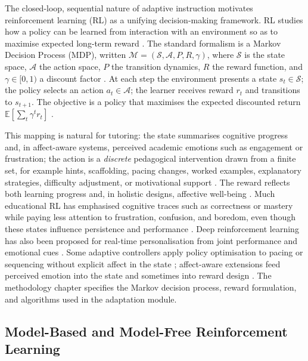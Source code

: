 The closed-loop, sequential nature of adaptive instruction motivates reinforcement learning (RL) as a unifying decision-making framework. RL studies how a policy can be learned from interaction with an environment so as to maximise expected long-term reward \cite{sutton_rl_book_2018}. The standard formalism is a Markov Decision Process (MDP), written $\mathcal{M} = (\mathcal{S}, \mathcal{A}, P, R, \gamma)$, where $\mathcal{S}$ is the state space, $\mathcal{A}$ the action space, $P$ the transition dynamics, $R$ the reward function, and $\gamma \in [0,1)$ a discount factor \cite{sutton_rl_book_2018}. At each step the environment presents a state $s_t \in \mathcal{S}$; the policy selects an action $a_t \in \mathcal{A}$; the learner receives reward $r_t$ and transitions to $s_{t+1}$. The objective is a policy that maximises the expected discounted return $\mathbb{E}[\sum_t \gamma^t r_t]$ \cite{sutton_rl_book_2018}.

This mapping is natural for tutoring: the state summarises cognitive progress and, in affect-aware systems, perceived academic emotions such as engagement or frustration; the action is a \emph{discrete} pedagogical intervention drawn from a finite set, for example hints, scaffolding, pacing changes, worked examples, explanatory strategies, difficulty adjustment, or motivational support \cite{axak_adaptive_nodate,perez_emotions_2024,gong_design_2025,deshmukh_developing_2025}. The reward reflects both learning progress and, in holistic designs, affective well-being \cite{perez_emotions_2024,gong_design_2025,fu_integrating_2025}. Much educational RL has emphasised cognitive traces such as correctness or mastery while paying less attention to frustration, confusion, and boredom, even though these states influence persistence and performance \cite{axak_adaptive_nodate,meng_self-evolving_2025,urbaite_adaptive_2026}. Deep reinforcement learning has also been proposed for real-time personalisation from joint performance and emotional cues \cite{govea_implementation_2024,gong_design_2025}. Some adaptive controllers apply policy optimisation to pacing or sequencing without explicit affect in the state \cite{axak_adaptive_nodate}; affect-aware extensions feed perceived emotion into the state and sometimes into reward design \cite{perez_emotions_2024,gong_design_2025}. The methodology chapter specifies the Markov decision process, reward formulation, and algorithms used in the adaptation module.

\subsection{Model-Based and Model-Free Reinforcement Learning}\label{sec:bg:model_free}

